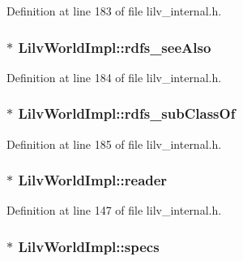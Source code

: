 Definition at line 183 of file lilv\+\_\+internal.\+h.

\subsubsection[{\texorpdfstring{rdfs\+\_\+see\+Also}{rdfs_seeAlso}}]{$\ast$ Lilv\+World\+Impl\+::rdfs\+\_\+see\+Also}\hypertarget{struct_lilv_world_impl_ae3f0e317dc158f7f5adc8b97116765f8}{}\label{struct_lilv_world_impl_ae3f0e317dc158f7f5adc8b97116765f8}


Definition at line 184 of file lilv\+\_\+internal.\+h.

\subsubsection[{\texorpdfstring{rdfs\+\_\+sub\+Class\+Of}{rdfs_subClassOf}}]{$\ast$ Lilv\+World\+Impl\+::rdfs\+\_\+sub\+Class\+Of}\hypertarget{struct_lilv_world_impl_aad49ee0b3335ef6a4f22548b3a57aab0}{}\label{struct_lilv_world_impl_aad49ee0b3335ef6a4f22548b3a57aab0}


Definition at line 185 of file lilv\+\_\+internal.\+h.

\subsubsection[{\texorpdfstring{reader}{reader}}]{$\ast$ Lilv\+World\+Impl\+::reader}\hypertarget{struct_lilv_world_impl_a5b976de1264ae35d7d33234379a72e8c}{}\label{struct_lilv_world_impl_a5b976de1264ae35d7d33234379a72e8c}


Definition at line 147 of file lilv\+\_\+internal.\+h.

\subsubsection[{\texorpdfstring{specs}{specs}}]{$\ast$ Lilv\+World\+Impl\+::specs}\hypertarget{struct_lilv_world_impl_ac0fa9fc4e090d3de71a95a4e4f73a5a6}{}\label{struct_lilv_world_impl_ac0fa9fc4e090d3de71a95a4e4f73a5a6}


